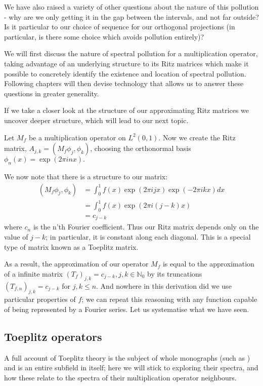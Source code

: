 \documentclass[../main.tex]{subfiles}
\begin{document}
We have also raised a variety of other questions about the nature of this
pollution - why are we only getting it in the gap between the intervals, and not
far outside? Is it particular to our choice of sequence for our orthogonal
projections (in particular, is there some choice which avoids pollution
entirely)?

We will first discuss the nature of spectral pollution for a multiplication
operator, taking advantage of an underlying structure to its Ritz matrices which
make it possible to concretely identify the existence and location of spectral
pollution. Following chapters will then devise technology that allows us to 
answer these questions in greater generality.

If we take a closer look at the structure of our approximating Ritz matrices we
uncover deeper structure, which will lead to our next topic.
\begin{example}\label{exp:mult-op-toeplitz}
Let $M_f$ be a multiplication operator on $L^2(0, 1)$. Now we create the Ritz
matrix, $A_{j,k} = (M_f \phi_j, \phi_k)$, choosing the orthonormal basis
$\phi_n(x) = \exp(2 \pi i n x).$

We now note that there is a structure to our matrix:
\begin{align*}
(M_f \phi_j, \phi_k) & = \int_0^1 f(x) \exp(2 \pi i j x) \exp(-2 \pi i k x) dx \\
& = \int_0^1 f(x) \exp(2 \pi i (j-k) x)\\
& = c_{j-k}
\end{align*}
where $c_n$ is the n'th Fourier coefficient. Thus our Ritz matrix depends only
on the value of $j-k$; in particular, it is constant along each
diagonal. This is a special type of matrix known as a Toeplitz matrix.
\end{example}
As a result, the approximation of our operator $M_f$ is equal to the
approximation of a infinite matrix $(T_f)_{j,k} = c_{j-k}, j,k \in \mathbb{N}_0$
by its truncations $(T_{f,n})_{j,k} = c_{j-k}$ for $j, k \leq n$. And nowhere in
this derivation did we use particular
properties of $f$; we can repeat this reasoning with any function capable of
being represented by a Fourier series. Let us systematise what we have seen.

\subsection{Toeplitz operators}\label{sec:toeplitz}

A full account of Toeplitz theory is the subject
of whole monographs (such as \parencite{bottcher1990analysis}) and is an entire
subfield in itself; here we will stick to exploring their spectra, and how these
relate to the spectra of their multiplication operator neighbours. 
\end{document}
